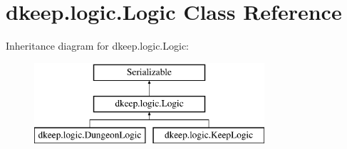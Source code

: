 \hypertarget{classdkeep_1_1logic_1_1_logic}{}\section{dkeep.\+logic.\+Logic Class Reference}
\label{classdkeep_1_1logic_1_1_logic}
Inheritance diagram for dkeep.\+logic.\+Logic\+:\begin{figure}[H]
\begin{center}
\leavevmode
\includegraphics[height=3.000000cm]{classdkeep_1_1logic_1_1_logic}
\end{center}
\end{figure}
